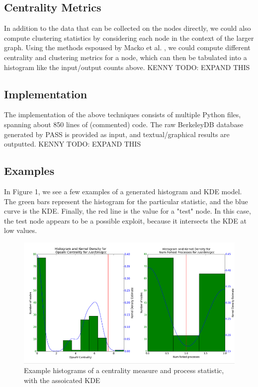 \documentclass[10pt,twocolumn]{article}
\begin{document}
\subsection{Centrality Metrics}
In addition to the data that can be collected on the nodes directly, we could also compute clustering statistics by considering each node in the context of the larger graph. Using the methods espoused by Macko et al. \cite{clustering}, we could compute different centrality and clustering metrics for a node, which can then be tabulated into a histogram like the input/output counts above. 
KENNY TODO: EXPAND THIS
\subsection{Implementation}
The implementation of the above techniques consists of multiple Python files, spanning about 850 lines of (commented) code. The raw BerkeleyDB database generated by PASS is provided as input, and textual/graphical results are outputted.
KENNY TODO: EXPAND THIS
\subsection{Examples}
In Figure 1, we see a few examples of a generated histogram and KDE model. The green bars represent the histogram for the particular statistic, and the blue curve is the KDE. Finally, the red line is the value for a "test" node. In this case, the test node appears to be a possible exploit, because it intersects the KDE at low values. 
\begin{figure}
  \caption{Example histograms of a centrality measure and process statistic, with the assoicated KDE}
  \centering
    \includegraphics[width=\textwidth]{img/hist.png}
\end{figure}
\end{document}
